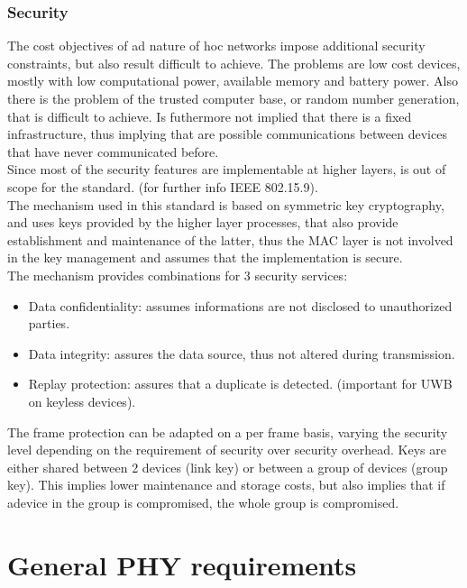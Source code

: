 \documentclass[conference]{IEEEtran}
\begin{document}
\subsubsection{Security}
The cost objectives of ad nature of hoc networks impose additional security constraints,
but also result difficult to achieve. The problems are low cost devices, mostly with low
computational power, available memory and battery power. Also there is the problem of
the trusted computer base, or random number generation, that is difficult to achieve.
Is futhermore not implied that there is a fixed infrastructure, thus implying that are possible
communications between devices that have never communicated before.\\

Since most of the security features are implementable at higher layers, is out of scope
for the standard\cite{10794632}. (for further info IEEE 802.15.9).\\

The mechanism used in this standard\cite{10794632} is based on symmetric key cryptography, and uses keys
provided by the higher layer processes, that also provide establishment and maintenance of
the latter, thus the MAC layer is not involved in the key management and assumes that the
implementation is secure.\\

The mechanism provides combinations for 3 security services:
\begin{itemize}
    \item Data confidentiality: assumes informations are not disclosed to unauthorized parties.
    \item Data integrity: assures the data source, thus not altered during transmission.
    \item Replay protection: assures that a duplicate is detected. (important for UWB on 
          keyless devices).
\end{itemize}

The frame protection can be adapted on a per frame basis, varying the security level depending
on the requirement of security over security overhead. Keys are either shared between 2 
devices (link key) or between a group of devices (group key). This implies lower maintenance
and storage costs, but also implies that if adevice in the group is compromised, the whole
group is compromised.\\

\section{General PHY requirements}
\end{document}
